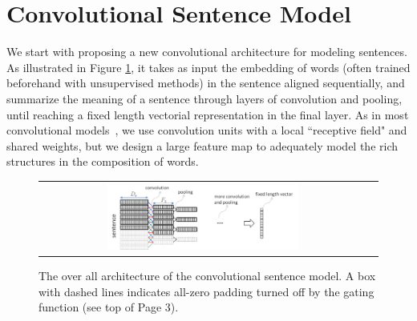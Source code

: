 \documentclass{article} %
\begin{document}
\vspace{-10pt}
\section{Convolutional Sentence Model} \label{s:senCNN} \vspace{-10pt}
We start with proposing a new convolutional architecture for modeling sentences. As illustrated in Figure \ref{f:senCNN}, it takes as input the embedding of words (often trained beforehand with unsupervised methods) in the sentence aligned sequentially, and summarize the meaning of a sentence through layers of convolution and pooling, until reaching a fixed length vectorial representation in the final layer. As in most convolutional models~\cite{cnn, cnn_speech}, we use convolution units with a local ``receptive field" and shared weights, but we design a large feature map to adequately model the rich structures in the composition of words. \vspace{-5pt}
\begin{figure}[h!]
\begin{center}
    \begin{tabular}[c]{cc}
      \includegraphics[width=0.6\textwidth]{pics/arc1.png} \vspace{-7pt}
\end{tabular}
    \caption{The over all architecture of the convolutional sentence model. A box with dashed lines indicates all-zero padding turned off by the gating function (see top of Page 3).}
    \label{f:senCNN}
  \end{center}
\end{figure} \vspace{-10pt}
\end{document}
